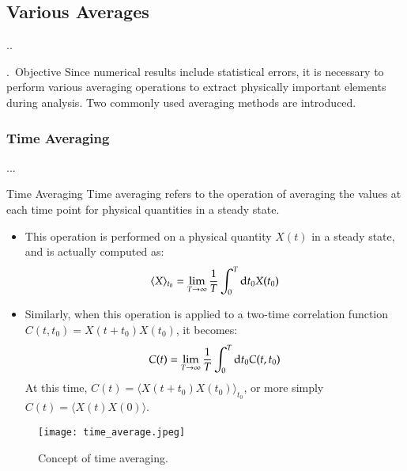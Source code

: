 \documentclass[aspectratio=169,dvipdfmx,cjk,handout,hyperref,8pt]{beamer} %
\theoremstyle{example}
\newcommand{\bi}{\begin{itemize}}
\newcommand{\ei}{\end{itemize}}
\begin{document}
\subsection{Various Averages}
\begin{frame}{\thesection.\thesubsection.~\insertsubsection} 
\begin{block}{\thesection.\thesubsection~Objective}
Since numerical results include statistical errors, it is necessary to perform various averaging operations to extract physically important elements during analysis. Two commonly used averaging methods are introduced.
\end{block}
\end{frame}

\subsubsection{Time Averaging}
\begin{frame}{\thesection.\thesubsection.\thesubsubsection.~\insertsubsubsection} 
\begin{exampleblock}{Time Averaging}
Time averaging refers to the operation of averaging the values at each time point for physical quantities in a steady state.
\end{exampleblock}
\bi
\item This operation is performed on a physical quantity $X(t)$ in a steady state, and is actually computed as:
\begin{eqnarray}
\langle X\rangle_{t_0}=\lim_{T\to\infty}\frac{1}{T}\int_0^T{\rm d}t_0 X(t_0)
\end{eqnarray}
\item Similarly, when this operation is applied to a two-time correlation function $C(t,t_0)=X(t+t_0)X(t_0)$, it becomes:
\begin{eqnarray}
 C(t)=\lim_{T\to\infty}\frac{1}{T}\int_0^T{\rm d}t_0C(t,t_0)
\end{eqnarray}
At this time, $C(t)=\langle X(t+t_0)X(t_0)\rangle_{t_0}$, or more simply $C(t)=\langle X(t)X(0)\rangle$.
\ei

\begin{figure}
\texttt{[image: time\_average.jpeg]}
\caption{Concept of time averaging.}
\label{fig:fig0}
\end{figure}

\end{frame}
\end{document}
